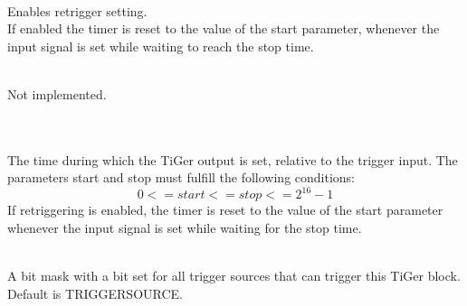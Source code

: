 	\\
	Enables retrigger setting.\\
	If enabled the timer is reset to the value of the \textsf{start} parameter, whenever the input signal is set while waiting to reach the \textsf{stop} time.\par

	\\
	Not implemented.


	\\
	\\
	The time during which the TiGer output is set, relative to the trigger input. The parameters \textsf{start} and \textsf{stop} must fulfill the following conditions:
	\[ 0 <= start <= stop <= 2^{16}-1 \]
	If retriggering is enabled, the timer is reset to the value of the start parameter whenever the input signal is set while waiting for the stop time. \par


	\\
	A bit mask with a bit set for all trigger sources that can trigger this TiGer block.
	Default is \textsf{\PREFIX TRIGGER\tu SOURCE\tu {}}.\par

